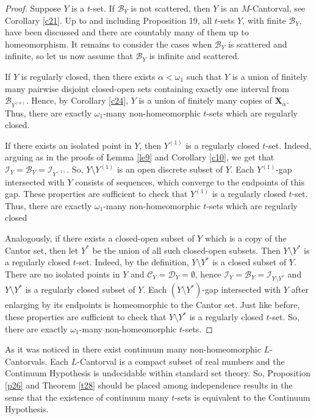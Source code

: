 \documentclass[12pt,a4paper,leqno]{amsart}
\theoremstyle{definition}
\begin{document}
\begin{proof} Suppose $Y$ is a $ t $-set. If $\mathcal B_Y$ is not scattered, then $Y$ is an $M$-Cantorval, see Corollary \ref{c21}. Up to and including Proposition 19, all $t$-sets $Y$, with finite $\mathcal B_Y$, have been discussed and there are countably many of them up to homeomorphism. 
 It remains to consider the cases when $\mathcal B_Y$ is scattered and infinite, so let us now assume that $\mathcal B_Y$ is infinite and scattered. 
	
		If $Y$ is regularly closed, then  there exists $\alpha < \omega_1$ such that $Y$ is a union of finitely many pairwise disjoint closed-open sets containing exactly one interval from  $\mathcal B_{Y^{(\alpha)}}$. Hence, by Corollary \ref{c24}, $Y$ is a union of finitely many copies of $\mathbf X_\alpha$.  Thus, there are exactly  $\omega_1$-many non-homeomorphic   $t$-sets which are regularly closed. 
	
	
	If there exists an isolated point in $Y$, then 	
	$Y^{(1)}$ is a regularly closed $ t $-set. Indeed,  arguing as in the proofs of Lemma \ref{le9} and Corollary \ref{c10}, we get that $\mathcal I_Y=\mathcal B_Y = \mathcal I_{Y^{(1)}}$. So, $Y \setminus Y^{(1)}$ is an open discrete subset of $Y$. Each  $Y^{(1)}$-gap  intersected  with $Y$ consists of   sequences, which converge to the endpoints of this gap. These properties are sufficient to check that $Y^{(1)}$ is a regularly closed $ t $-set. Thus, there are exactly  $\omega_1$-many non-homeomorphic   $t$-sets which are regularly closed
	
	Analogously, if there exists a closed-open subset of $Y$ which is a copy of the Cantor set,  then  let $Y^*$ be the union of all such closed-open subsets. Then 	
	$Y \setminus Y^{*}$ is a regularly closed $ t $-set. Indeed, by the definition, $Y \setminus Y^{*}$ is a  closed  subset of $Y$. There are no isolated points in $Y$ and $\mathcal C_Y=\mathcal D_Y =\emptyset$, hence  
	$\mathcal I_Y=\mathcal B_Y = \mathcal I_{Y\setminus Y^{*}}$ and $Y \setminus Y^{*}$ is a regularly closed  subset of $Y$. Each  $(Y\setminus Y^{*})$-gap  intersected  with $Y$ after enlarging by its endpoints is homeomorphic to the Cantor set. Just like before, these properties are sufficient  to check that $Y\setminus Y^{*}$ is a regularly closed $ t $-set. So, there are exactly  $\omega_1$-many non-homeomorphic   $t$-sets.	 
	\end{proof} 
	
	As it was noticed in \cite[Theorem 17]{bkp} there exist continuum many non-homeomorphic $L$-Cantorvals. Each $L$-Cantorval is  a compact subset of real numbers and the Continuum Hypothesis is undecidable within standard set theory. So,    Proposition \ref{p26} and Theorem \ref{t28} should be placed among  independence results
	in the sense that the existence of continuum  many $t$-sets is equivalent to the Continuum Hypothesis. 
	
\end{document}
